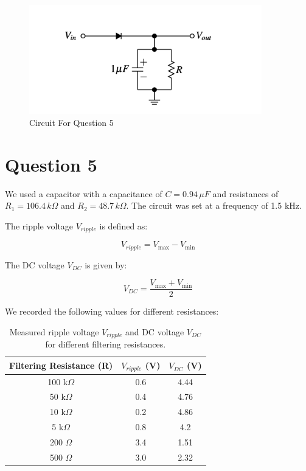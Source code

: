 \documentclass{article}
\begin{document}
\begin{figure}[H]
    \centering
    \includegraphics[width=0.9\textwidth]{./img/other/Lab4_5.png}
    \caption{Circuit For Question 5}
    \label{fig:graph12}
\end{figure}

\section*{Question 5}

We used a capacitor with a capacitance of \(C = 0.94 \, \mu F\) and resistances of \( R_1 = 106.4 \, k\Omega \) and \( R_2 = 48.7 \, k\Omega \). The circuit was set at a frequency of 1.5 kHz.

The ripple voltage \( V_{ripple} \) is defined as:

\[
V_{ripple} = V_{\text{max}} - V_{\text{min}}
\]

The DC voltage \( V_{DC} \) is given by:

\[
V_{DC} = \frac{V_{\text{max}} + V_{\text{min}}}{2}
\]

We recorded the following values for different resistances:

\begin{table}[H]
\centering
\begin{tabular}{|c|c|c|}
\hline
Filtering Resistance (R) & \( V_{ripple} \) (V) & \( V_{DC} \) (V) \\
\hline
100 k\(\Omega\) & 0.6 & 4.44 \\
50 k\(\Omega\) & 0.4 & 4.76 \\
10 k\(\Omega\) & 0.2 & 4.86 \\
5 k\(\Omega\)  & 0.8 & 4.2  \\
200 \(\Omega\) & 3.4 & 1.51 \\
500 \(\Omega\) & 3.0 & 2.32 \\
\hline
\end{tabular}
\caption{Measured ripple voltage \( V_{ripple} \) and DC voltage \( V_{DC} \) for different filtering resistances.}
\end{table}
\end{document}
